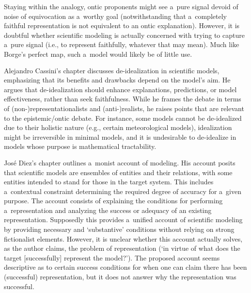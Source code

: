 Staying within the analogy, ontic proponents might see a~pure signal devoid of noise of equivocation as a~worthy goal (notwithstanding that a~completely faithful representation is not equivalent to an ontic explanation). However, it is doubtful whether scientific modeling is actually concerned with trying to capture a~pure signal (i.e., to represent faithfully, whatever that may mean). Much like Borge's perfect map, such a~model would likely be of little use.

Alejandro Cassini's chapter discusses de-idealization in scientific models, emphasizing that its benefits and drawbacks depend on the model's aim. He argues that de-idealization should enhance explanations, predictions, or model effectiveness, rather than seek faithfulness. While he frames the debate in terms of (non-)representationalists and (anti-)realists, he raises points that are relevant to the epistemic/ontic debate. For instance, some models cannot be de-idealized due to their holistic nature (e.g., certain meteorological models), idealization might be irreversible in minimal models, and it is undesirable to de-idealize in models whose purpose is mathematical tractability.

José Diez's chapter outlines a~monist account of modeling. His account posits that scientific models are ensembles of entities and their relations, with some entities intended to stand for those in the target system. This includes a~contextual constraint determining the required degree of accuracy for a~given purpose. The account consists of explaining the conditions for performing a~representation and analyzing the success or adequacy of an existing representation. Supposedly this provides a~unified account of scientific modeling by providing necessary and ‘substantive' conditions without relying on strong fictionalist elements. However, it is unclear whether this account actually solves, as the author claims, the problem of representation (‘in virtue of what does the target [successfully] represent the model?'). The proposed account seems descriptive as to certain success conditions for when one can claim there has been (successful) representation, but it does not answer why the representation was successful.

